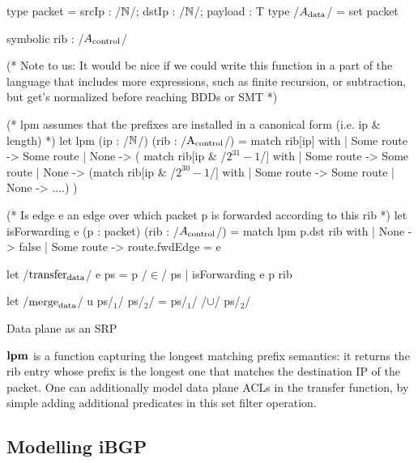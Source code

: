 \documentclass[sigconf,10pt]{acmart}
\begin{document}
\begin{listing}[ht]
  \begin{ocamlcode}
    type packet = { srcIp : /$\nat$/; dstIp : /$\nat$/; payload : T }
    type /$A_{\data}$/ = set packet

    symbolic rib : /$A_{\control}$/ 

    (* Note to us: It would be nice if we could write this function in a part of the language that includes more expressions,
    such as finite recursion, or subtraction, but get's normalized before reaching BDDs or SMT *)
    
    (* lpm assumes that the prefixes are installed in a canonical form (i.e. ip & length) *)
    let lpm (ip : /$\nat$/) (rib : /$\A_{\control}$/) =
      match rib[ip] with
      | Some route -> Some route
      | None -> (
        match rib[ip & /$2^{31}-1$/] with
        | Some route -> Some route
        | None ->
          (match rib[ip & /$2^{30}-1$/] with
           | Some route -> Some route
           | None -> ....)
        )

    (* Is edge e an edge over which packet p is forwarded according to this rib *)   
    let isForwarding e (p : packet) (rib : /$A_{\control}$/) =
      match lpm p.dst rib with
      | None -> false
      | Some route -> route.fwdEdge = e
    
    let /$\transfer_{\data}$/ e ps =
      { p /$\in$/ ps | isForwarding e p rib}
   
    let /$\merge_{\data}$/ u ps/$_1$/ ps/$_2$/ =
      ps/$_1$/ /$\cup$/ ps/$_2$/
\end{ocamlcode}
\caption{Data plane as an SRP}
\label{lst:data-srp}
\end{listing}
 
$\mathbf{lpm}$ is a function capturing the longest matching prefix
semantics: it returns the rib entry whose prefix is the longest one
that matches the destination IP of the packet. One can additionally
model data plane ACLs in the transfer function, by simple adding
additional predicates in this set filter operation.

\subsection{Modelling iBGP}
\end{document}
